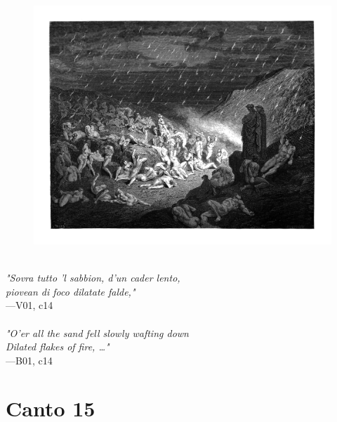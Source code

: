 \documentclass[../Dore_vision.tex]{subfiles}
\begin{document}
\begin{figure}[ht]
\centering
\includegraphics[height=\figsize]{illustrations/book_1/V01, c14.jpg}
\end{figure}

\begin{center}
\begin{minipage}{0.8\linewidth}
\textit{\\
"Sovra tutto ’l sabbion, d’un cader lento,\\piovean di foco dilatate falde,"} \\
—V01, c14 \\~\\
\textit{"O'er all the sand fell slowly wafting down\\Dilated flakes of fire, …"} \\
—B01, c14
\end{minipage}
\end{center}

\newpage

\section{Canto 15}
\end{document}
